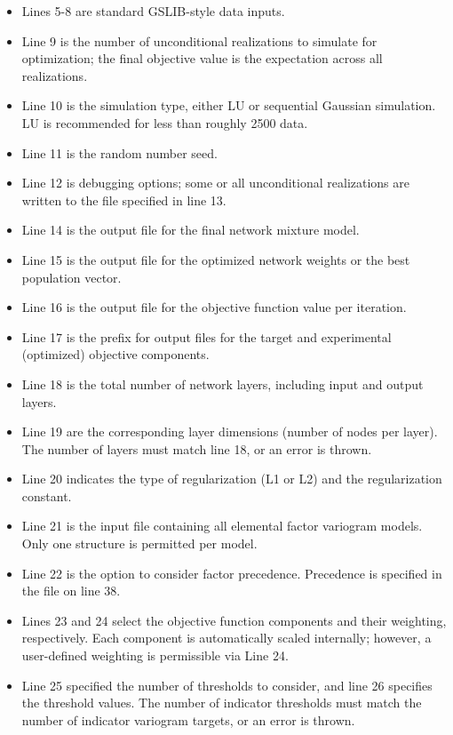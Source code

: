 \begin{itemize}[noitemsep]
   \item Lines 5-8 are standard GSLIB-style data inputs.
   \item Line 9 is the number of unconditional realizations to simulate for optimization; the final objective value is the expectation across all realizations.
   \item Line 10 is the simulation type, either LU or sequential Gaussian simulation. LU is recommended for less than roughly 2500 data.
   \item Line 11 is the random number seed.
   \item Line 12 is debugging options; some or all unconditional realizations are written to the file specified in line 13.
   \item Line 14 is the output file for the final network mixture model.
   \item Line 15 is the output file for the optimized network weights or the best population vector.
   \item Line 16 is the output file for the objective function value per iteration.
   \item Line 17 is the prefix for output files for the target and experimental (optimized) objective components.
   \item Line 18 is the total number of network layers, including input and output layers.
   \item Line 19 are the corresponding layer dimensions (number of nodes per layer). The number of layers must match line 18, or an error is thrown.
   \item Line 20 indicates the type of regularization (L1 or L2) and the regularization constant.
   \item Line 21 is the input file containing all elemental factor variogram models. Only one structure is permitted per model.
   \item Line 22 is the option to consider factor precedence. Precedence is specified in the file on line 38.
   \item Lines 23 and 24 select the objective function components and their weighting, respectively. Each component is automatically scaled internally; however, a user-defined weighting is permissible via Line 24.
   \item Line 25 specified the number of thresholds to consider, and line 26 specifies the threshold values. The number of indicator thresholds must match the number of indicator variogram targets, or an error is thrown.

\end{itemize}
